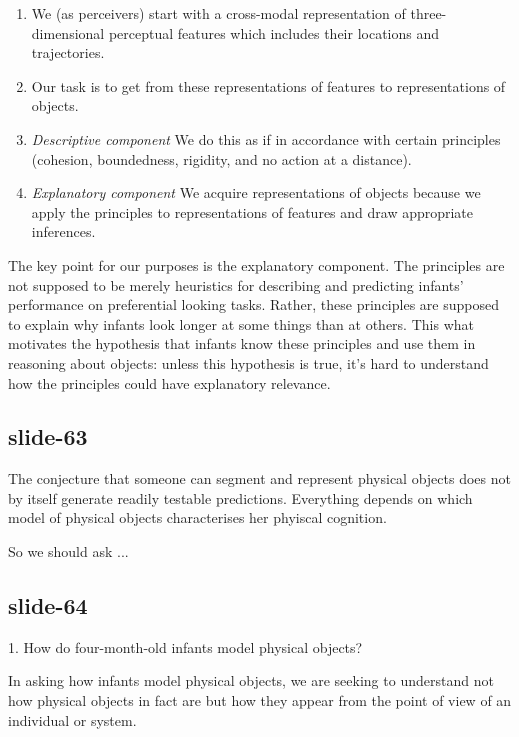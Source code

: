 \documentclass[12pt,\papersize]{extarticle}
\begin{document}
\begin{enumerate}

\item We (as perceivers) start with a cross-modal representation of three-dimensional 
perceptual features which includes their locations and trajectories.

\item Our task is to get from these representations of features to representations of objects.

\item \emph{Descriptive component} We do this as if in accordance with certain principles 
(cohesion, boundedness, rigidity, and no action at a distance).

\item \emph{Explanatory component}  We acquire representations of objects because we apply the 
principles to representations of features and draw appropriate inferences.

\end{enumerate}
 
The key point for our purposes is the explanatory component.
The principles are not supposed to be merely heuristics for describing and predicting infants’ 
performance on preferential looking tasks.
Rather, these principles are supposed to explain why infants look longer at some things than at 
others.
This what motivates the hypothesis that infants know these principles and use them in 
reasoning about objects: unless this hypothesis is true, it’s hard to understand how the 
principles could have explanatory relevance.
 
\subsection{slide-63}
The conjecture that someone can segment and represent physical objects
does not by itself generate readily testable predictions.
Everything depends on which model of physical objects characterises her
phyiscal cognition.
 
So we should ask ...
 
\subsection{slide-64}
1. How do four-month-old infants  model  physical objects?
 
In asking how infants
model physical objects, we are seeking to understand not how physical objects
in fact are but how they appear from the point of view of
an individual or system.
 
\end{document}
